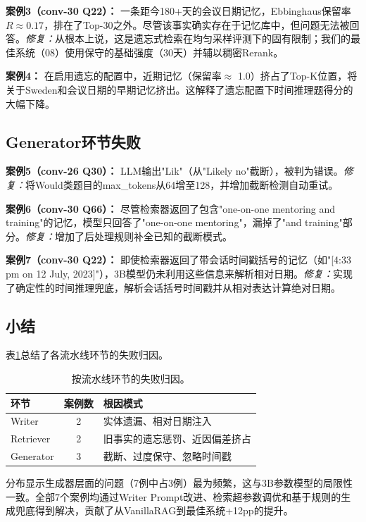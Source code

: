 \documentclass[11pt,a4paper]{ctexart}
\begin{document}
\textbf{案例3（conv-30 Q22）：} 一条距今180+天的会议日期记忆，Ebbinghaus保留率$R \approx 0.17$，排在了Top-30之外。尽管该事实确实存在于记忆库中，但问题无法被回答。\emph{修复：}从根本上说，这是遗忘式检索在均匀采样评测下的固有限制；我们的最佳系统（08）使用保守的基础强度（30天）并辅以稠密Rerank。

\textbf{案例4：} 在启用遗忘的配置中，近期记忆（保留率$\approx$ 1.0）挤占了Top-K位置，将关于Sweden和会议日期的早期记忆挤出。这解释了遗忘配置下时间推理题得分的大幅下降。

\subsection{Generator环节失败}

\textbf{案例5（conv-26 Q30）：} LLM输出"Lik"（从"Likely no"截断），被判为错误。\emph{修复：}将Would类题目的max\_tokens从64增至128，并增加截断检测自动重试。

\textbf{案例6（conv-30 Q66）：} 尽管检索器返回了包含"one-on-one mentoring and training"的记忆，模型只回答了"one-on-one mentoring"，漏掉了"and training"部分。\emph{修复：}增加了后处理规则补全已知的截断模式。

\textbf{案例7（conv-30 Q22）：} 即使检索器返回了带会话时间戳括号的记忆（如"[4:33 pm on 12 July, 2023]"），3B模型仍未利用这些信息来解析相对日期。\emph{修复：}实现了确定性的时间推理兜底，解析会话括号时间戳并从相对表达计算绝对日期。

\subsection{小结}

表\ref{tab:badcase}总结了各流水线环节的失败归因。

\begin{table}[H]
\centering
\begin{tabular}{@{}lcl@{}}
\toprule
\textbf{环节} & \textbf{案例数} & \textbf{根因模式} \\
\midrule
Writer & 2 & 实体遗漏、相对日期注入 \\
Retriever & 2 & 旧事实的遗忘惩罚、近因偏差挤占 \\
Generator & 3 & 截断、过度保守、忽略时间戳 \\
\bottomrule
\end{tabular}
\caption{按流水线环节的失败归因。}
\label{tab:badcase}
\end{table}

分布显示生成器层面的问题（7例中占3例）最为频繁，这与3B参数模型的局限性一致。全部7个案例均通过Writer Prompt改进、检索超参数调优和基于规则的生成兜底得到解决，贡献了从VanillaRAG到最佳系统+12pp的提升。
\end{document}
